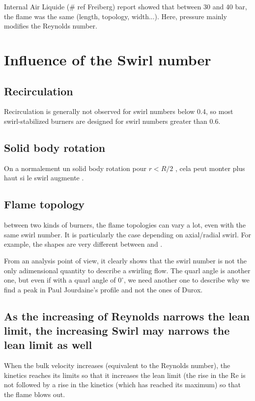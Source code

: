 Internal Air Liquide (\# ref Freiberg) report showed that between 30 and 40 bar, the flame was the same (length, topology, width...).  Here, pressure mainly modifies the Reynolds number.


\section{Influence of the Swirl number}

\subsection{Recirculation}

Recirculation is generally not observed for swirl numbers below 0.4, so most swirl-stabilized burners are designed for swirl numbers greater than 0.6.

\subsection{Solid body rotation}

On a normalement un solid body rotation pour $r<R/2$ \cite{toh_axial_2010} , cela peut monter plus haut si le swirl augmente \cite{durox_flame_2013}.

\subsection{Flame topology}

between two kinds of burners, the flame topologies can vary a lot, even with the same swirl number. It is particularly the case depending on axial/radial swirl. For example, the shapes are very different between \cite{paul_jourdaine_nom_effect_2016} and \cite{durox_flame_2013}.

From an analysis point of view, it clearly shows that the swirl number is not the only adimensional quantity to describe a swirling flow. The quarl angle is another one, but even if with a quarl angle of $0^\circ$, we need another one to describe why we find a peak in Paul Jourdaine's profile and not the ones of Durox.

\subsection{As the increasing of Reynolds narrows the lean limit, the increasing Swirl may narrows the lean limit as well}

When the bulk velocity increases (equivalent to the Reynolds number), the kinetics reaches its limits so that it increases the lean limit (the rise in the Re is not followed by a rise in the kinetics (which has reached its maximum) so that the flame blows out.

